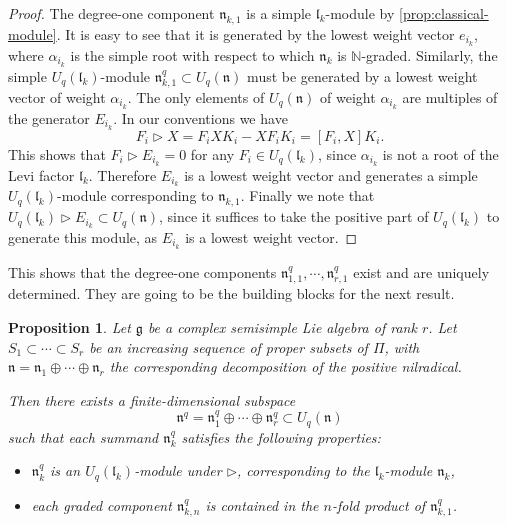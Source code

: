 \documentclass[a4paper, 12pt, reqno, english]{amsart}
\numberwithin{equation}{section}
\numberwithin{figure}{section}
\theoremstyle{plain}
\theoremstyle{plain}
\theoremstyle{plain}
\newtheorem{proposition}[theorem]{Proposition}
\theoremstyle{plain}
\theoremstyle{plain}
\theoremstyle{definition}
\theoremstyle{definition}
\theoremstyle{definition}
\theoremstyle{remark}
\theoremstyle{definition}
\theoremstyle{definition}
\newcommand{\Uqn}{U_q(\mathfrak{n})}
\newcommand{\Uqlk}{U_q(\mathfrak{l}_k)}
\newcommand{\bbN}{\mathbb{N}}
\newcommand{\lieg}{\mathfrak{g}}
\newcommand{\liel}{\mathfrak{l}}
\newcommand{\lien}{\mathfrak{n}}
\newcommand{\simpleroots}{\Pi}
\newcommand{\qnil}{\lien^q}
\begin{document}
\begin{proof}
The degree-one component $\lien_{k, 1}$ is a simple $\liel_k$-module by \cref{prop:classical-module}.
It is easy to see that it is generated by the lowest weight vector $e_{i_k}$, where $\alpha_{i_k}$ is the simple root with respect to which $\lien_k$ is $\bbN$-graded.
Similarly, the simple $\Uqlk$-module $\qnil_{k, 1} \subset \Uqn$ must be generated by a lowest weight vector of weight $\alpha_{i_k}$. The only elements of $\Uqn$ of weight $\alpha_{i_k}$ are multiples of the generator $E_{i_k}$.
In our conventions we have
\[
F_i \triangleright X = F_i X K_i - X F_i K_i = [F_i, X] K_i.
\]
This shows that $F_i \triangleright E_{i_k} = 0$ for any $F_i \in \Uqlk$, since $\alpha_{i_k}$ is not a root of the Levi factor $\liel_k$.
Therefore $E_{i_k}$ is a lowest weight vector and generates a simple $\Uqlk$-module corresponding to $\lien_{k, 1}$.
Finally we note that $\Uqlk \triangleright E_{i_k} \subset \Uqn$, since it suffices to take the positive part of $\Uqlk$ to generate this module, as $E_{i_k}$ is a lowest weight vector.
\end{proof}

This shows that the degree-one components $\qnil_{1, 1}, \cdots, \qnil_{r, 1}$ exist and are uniquely determined.
They are going to be the building blocks for the next result.

\begin{proposition}
\label{prop:equivariant-quantizations}
Let $\lieg$ be a complex semisimple Lie algebra of rank $r$.
Let $S_1 \subset \cdots \subset S_r$ be an increasing sequence of proper subsets of $\simpleroots$, with $\lien = \lien_1 \oplus \cdots \oplus \lien_r$ the corresponding decomposition of the positive nilradical.

Then there exists a finite-dimensional subspace
\[
\qnil = \qnil_1 \oplus \cdots \oplus \qnil_r \subset \Uqn
\]
such that each summand $\qnil_k$ satisfies the following properties:
\begin{itemize}
\item $\qnil_k$ is an $U_q(\liel_k)$-module under $\triangleright$, corresponding to the $\liel_k$-module $\lien_k$,
\item each graded component $\qnil_{k, n}$ is contained in the $n$-fold product of $\qnil_{k, 1}$.
\end{itemize}
\end{proposition}
\end{document}
